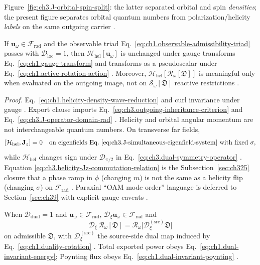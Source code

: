 Figure~\ref{fig:ch3.J-orbital-spin-split}: the latter separated orbital and spin \emph{densities}; the present
figure separates orbital quantum numbers from polarization/helicity \emph{labels} on the same outgoing carrier
\cite{belinfante1940}.
\begin{theorem}
\label{thm:ch3.helicity-gauge-invariance}
If \(\mathbf{u}_\omega\in\mathcal{F}_{\mathrm{rad}}\) and the observable triad
Eq.~\eqref{eq:ch1.observable-admissibility-triad} passes with \(\mathcal{D}_{\mathrm{loc}}=1\), then
\(\mathcal{H}_{\mathrm{hel}}[\mathbf{u}_\omega]\) is unchanged under gauge transforms
Eq.~\eqref{eq:ch1.gauge-transform} and transforms as a pseudoscalar under
Eq.~\eqref{eq:ch1.active-rotation-action} \cite{stratton1941}. Moreover,
\(\mathcal{H}_{\mathrm{hel}}[\mathcal{R}_\omega[\mathfrak{D}]]\) is meaningful only when evaluated on the
outgoing image, not on \(\mathcal{S}_\omega[\mathfrak{D}]\) reactive restrictions
\cite{harrington2001}.
\end{theorem}
\noindent\textit{Proof.}
Eq.~\eqref{eq:ch1.helicity-density-wave-reduction} and curl invariance under gauge
\cite{stratton1941}. Export clause imports Eq.~\eqref{eq:ch3.outgoing-inheritance-criterion} and
Eq.~\eqref{eq:ch3.J-operator-domain-rad} \cite{harrington2001}.
Helicity and orbital angular momentum are not interchangeable quantum numbers. On transverse far fields,
\begin{equation}
\label{eq:ch3.helicity-Jz-commutation-relation}
[\mathcal{H}_{\mathrm{hel}},\mathbf{J}_{z}]
=
0
\quad\text{on eigenfields Eq.~\eqref{eq:ch3.J-simultaneous-eigenfield-system} with fixed }\sigma,
\end{equation}
while \(\mathcal{H}_{\mathrm{hel}}\) changes sign under \(\mathcal{D}_{\pi/2}\) in
Eq.~\eqref{eq:ch3.dual-symmetry-operator} \cite{jackson1999}. Equation
\eqref{eq:ch3.helicity-Jz-commutation-relation} is the Subsection~\ref{sec:ch325} closure that a phase ramp
in \(\phi\) (changing \(m\)) is not the same as a helicity flip (changing \(\sigma\)) on \(\mathcal{F}_{\mathrm{rad}}\)
\cite{allen1992}. Paraxial ``OAM mode order'' language is deferred to Section~\ref{sec:ch39} with
explicit gauge caveats \cite{allen1992}.
\begin{proposition}
\label{prop:ch3.dual-preserves-radiation}
When \(\mathcal{D}_{\mathrm{dual}}=1\) and \(\mathbf{u}_\omega\in\mathcal{F}_{\mathrm{rad}}\),
\(\mathcal{D}_{\xi}\mathbf{u}_\omega\in\mathcal{F}_{\mathrm{rad}}\) and
\begin{equation}
\label{eq:ch3.dual-radiation-intertwine}
\mathcal{D}_{\xi}\,\mathcal{R}_\omega[\mathfrak{D}]
=
\mathcal{R}_\omega\big[\mathcal{D}_{\xi}^{(\mathrm{src})}\mathfrak{D}\big]
\end{equation}
on admissible \(\mathfrak{D}\), with \(\mathcal{D}_{\xi}^{(\mathrm{src})}\) the source-side dual map induced by
Eq.~\eqref{eq:ch1.duality-rotation} \cite{stratton1941}. Total exported power obeys
Eq.~\eqref{eq:ch1.dual-invariant-energy}; Poynting flux obeys
Eq.~\eqref{eq:ch1.dual-invariant-poynting} \cite{stratton1941}.
\end{proposition}
